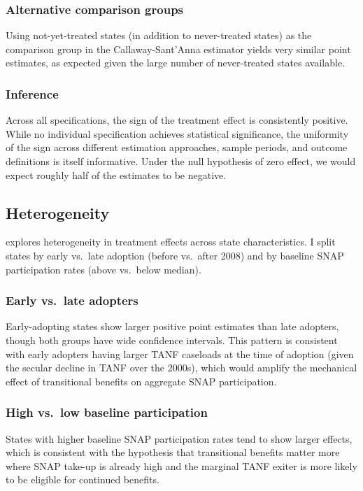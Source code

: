 \documentclass[12pt]{article}
\begin{document}
\subsubsection*{Alternative comparison groups} Using not-yet-treated states (in addition to never-treated states) as the comparison group in the Callaway-Sant'Anna estimator yields very similar point estimates, as expected given the large number of never-treated states available.

\subsubsection*{Inference} Across all specifications, the sign of the treatment effect is consistently positive. While no individual specification achieves statistical significance, the uniformity of the sign across different estimation approaches, sample periods, and outcome definitions is itself informative. Under the null hypothesis of zero effect, we would expect roughly half of the estimates to be negative.

\subsection{Heterogeneity}



 explores heterogeneity in treatment effects across state characteristics. I split states by early vs.\ late adoption (before vs.\ after 2008) and by baseline SNAP participation rates (above vs.\ below median).

\subsubsection*{Early vs.\ late adopters} Early-adopting states show larger positive point estimates than late adopters, though both groups have wide confidence intervals. This pattern is consistent with early adopters having larger TANF caseloads at the time of adoption (given the secular decline in TANF over the 2000s), which would amplify the mechanical effect of transitional benefits on aggregate SNAP participation.

\subsubsection*{High vs.\ low baseline participation} States with higher baseline SNAP participation rates tend to show larger effects, which is consistent with the hypothesis that transitional benefits matter more where SNAP take-up is already high and the marginal TANF exiter is more likely to be eligible for continued benefits.
\end{document}
